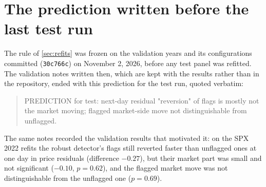 \section{The prediction written before the last test run}
\label{app:prediction}

The rule of \cref{sec:refits} was frozen on the validation years and its configurations committed
(\texttt{30c766c}) on November 2, 2026, before any test panel was refitted. The validation notes
written then, which are kept with the results rather than in the repository, ended with this
prediction for the test run, quoted verbatim:

\begin{quote}
\small\ttfamily\raggedright
PREDICTION for test: next-day residual "reversion" of flags is mostly not the market moving;
flagged market-side move not distinguishable from unflagged.
\end{quote}

\noindent The same notes recorded the validation results that motivated it: on the SPX 2022 refits
the robust detector's flags still reverted faster than unflagged ones at one day in price residuals
(difference $-0.27$), but their market part was small and not significant ($-0.10$, $p=0.62$), and
the flagged market move was not distinguishable from the unflagged one ($p=0.69$).
